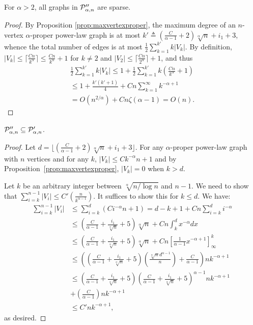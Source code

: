 \begin{proposition}\label{prop:powerlawsparse}
For $\alpha > 2$, all graphs in $ \mathcal{P}''_{\alpha,n}$ are sparse.
\end{proposition}
\begin{proof}
By Proposition \ref{prop:maxvertexproper}, the maximum degree of an $n$-vertex $\alpha$-proper power-law
graph is at most $k' \triangleq \left(\frac{C}{\alpha - 1} + 2\right) \sqrt[\alpha]{n} + i_1 + 3$, whence
the total number of edges is at most $\frac{1}{2}\sum_{k=1}^{k'} k \vert V_k\vert$. By definition,
$\vert V_k \vert\leq \lceil \frac{Cn}{k^\alpha}\rceil \leq \frac{Cn}{k^{\alpha}} + 1$ for $k\neq 2$ and $\vert V_2\vert\leq\lceil\frac{Cn}{2^{\alpha}}\rceil + 1$, and thus
\begin{align*}
\frac{1}{2}\sum_{k=1}^{k'} k\vert V_k\vert \leq 1 + \frac{1}{2}\sum_{k=1}^{k'} k \left(\frac{Cn}{k^{\alpha}} + 1 \right) \\
\leq 1 + \frac{k'(k'+1)}{4} + Cn\sum_{k=1}^{\infty} k^{-\alpha+1} \\
= O(n^{2/\alpha}) + Cn \zeta(\alpha - 1) = O(n).
\end{align*}
\end{proof}

\begin{proposition}\label{prop:Contained}
$ \mathcal{P}''_{\alpha,n} \subseteq  \mathcal{P}'_{\alpha,n}$.
\end{proposition}
\begin{proof}
Let $d = \lfloor(\frac C{\alpha - 1} + 2)\sqrt[\alpha]{n} + i_1 + 3\rfloor$. For any $\alpha$-proper power-law graph with $n$ vertices and for any $k$, $\vert V_k\vert\leq Ck^{-\alpha}n + 1$ and by Proposition~\ref{prop:maxvertexproper}, $\vert V_k\vert = 0$ when $k > d$.

Let $k$ be an arbitrary integer between $\sqrt[\alpha]{n/\log n}$ and $n-1$. We need to show that $\sum_{i = k}^{n-1} {\vert V_i\vert} \leq C'(\frac{n}{k^{\alpha-1}})$. It suffices to show this for $k\leq d$. We have:
\begin{align*}
  \sum_{i = k}^{n-1} {\vert V_i\vert} & \leq \sum_{i = k}^d(Ci^{-\alpha}n + 1)=    d - k + 1 + Cn\sum_{i = k}^d i^{-\alpha}\\
  & \leq \left(\frac C{\alpha - 1} + \frac{i_1}{\sqrt[\alpha]n} + 5\right)\sqrt[\alpha]{n} + Cn\int_k^d x^{-\alpha}dx\\
  & \leq \left(\frac C{\alpha - 1} + \frac{i_1}{\sqrt[\alpha]n} + 5\right)\sqrt[\alpha]{n} + Cn\left[\frac 1{\alpha - 1}x^{-\alpha+1}\right]_\infty^k\\
  & \leq \left(\left(\frac C{\alpha - 1} + \frac{i_1}{\sqrt[\alpha]n} + 5\right)\left(\frac{\sqrt[\alpha]nd^{\alpha-1}}n\right) + \frac {C}{\alpha - 1}\right)nk^{-\alpha +1}\\
  & \leq \left(\frac C{\alpha - 1} + \frac{i_1}{\sqrt[\alpha]n} + 5\right)\left(\frac C{\alpha-1} + \frac{i_1}{\sqrt[\alpha]n} + 5\right)^{\alpha - 1}  nk^{-\alpha+1} \\
  & +  \left(\frac{C}{\alpha - 1}\right) nk^{-\alpha+1} \\
  & \leq C'nk^{-\alpha+1},
\end{align*}
as desired.
\end{proof}

